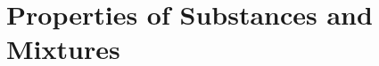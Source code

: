 \documentclass[../chem.tex]{subfiles}
\begin{document}
\chapter{Properties of Substances and Mixtures}
\end{document}
